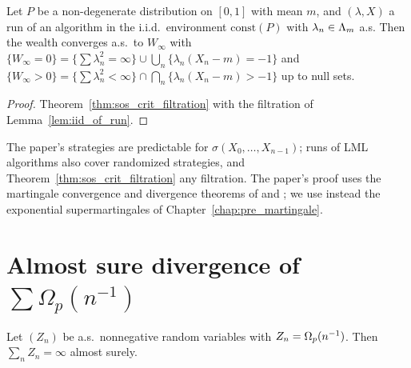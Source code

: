 \begin{theorem}
  \label{thm:sos_crit}
  \leanok
  Let $P$ be a non-degenerate distribution on $[0,1]$ with mean $m$, and $(\lambda, X)$ a run of an
  algorithm in the i.i.d.\ environment $\mathrm{const}(P)$ with $\lambda_n \in \Lambda_m$ a.s. Then the
  wealth converges a.s.\ to $W_\infty$ with $\{W_\infty = 0\} = \{\sum \lambda_n^2 = \infty\} \cup
  \bigcup_n \{\lambda_n (X_n - m) = -1\}$ and $\{W_\infty > 0\} = \{\sum \lambda_n^2 < \infty\} \cap
  \bigcap_n \{\lambda_n(X_n - m) > -1\}$ up to null sets.
\end{theorem}

\begin{proof}
  \leanok
  Theorem~\ref{thm:sos_crit_filtration} with the filtration of Lemma~\ref{lem:iid_of_run}.
\end{proof}

\begin{remark}
  The paper's strategies are predictable for $\sigma(X_0, \dots, X_{n-1})$; runs of LML algorithms
  also cover randomized strategies, and Theorem~\ref{thm:sos_crit_filtration} any filtration. The
  paper's proof uses the martingale convergence and divergence theorems of
  \cite{hall2014martingale} and \cite{Fitzsimmonslecturenotes}; we use instead the exponential
  supermartingales of Chapter~\ref{chap:pre_martingale}.
\end{remark}

\section{\texorpdfstring{Almost sure divergence of $\sum \Omega_p(n^{-1})$}{Almost sure divergence of sums of order 1/n in probability}}

\begin{theorem}[Theorem 2.2]
  \label{thm:sum_of_op}
  \leanok
  Let $(Z_n)$ be a.s.\ nonnegative random variables with $Z_n = \Omega_p(n^{-1})$. Then
  $\sum_n Z_n = \infty$ almost surely.
\end{theorem}

